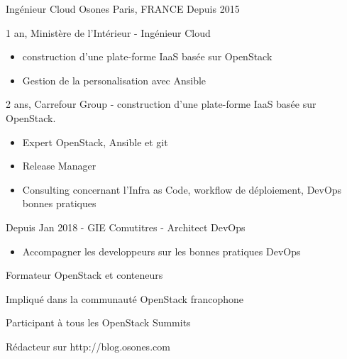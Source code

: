 

\begin{cventries}

  \cventry
    {Ingénieur Cloud} %
    {Osones} %
    {Paris, FRANCE} %
    {Depuis 2015} %
    {
      \begin{cvitems} %
        \item {1 an, Ministère de l'Intérieur - Ingénieur Cloud}
          \begin{itemize}
            \item {construction d'une plate-forme IaaS basée sur OpenStack}
            \item {Gestion de la personalisation avec Ansible}
          \end{itemize}
        \item {2 ans, Carrefour Group - construction d'une plate-forme IaaS basée sur OpenStack.}
            \begin{itemize}
              \item {Expert OpenStack, Ansible et git}
              \item {Release Manager}
              \item {Consulting concernant l'Infra as Code, workflow de déploiement, DevOps bonnes pratiques}
            \end{itemize}
        \item {Depuis Jan 2018 - GIE Comutitres - Architect DevOps}
            \begin{itemize}
              \item {Accompagner les developpeurs sur les bonnes pratiques DevOps}
            \end{itemize}
        \item {Formateur OpenStack et conteneurs}
        \item {Impliqué dans la communauté OpenStack francophone}
        \item {Participant à tous les OpenStack Summits}
        \item {Rédacteur sur http://blog.osones.com}
      \end{cvitems}
    }


\end{cventries}
